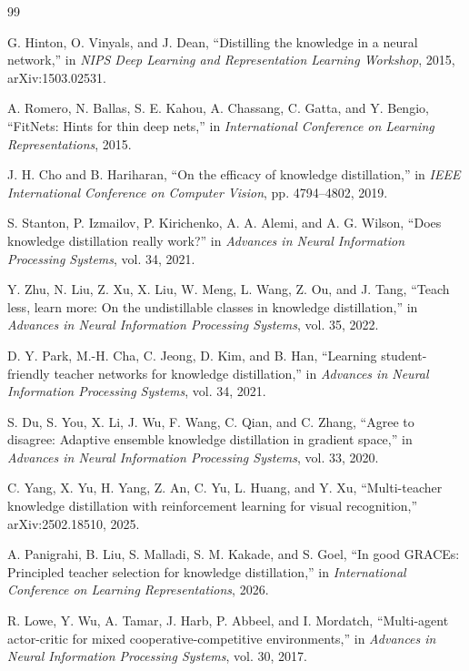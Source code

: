 \documentclass[10pt,twocolumn,a4paper]{article}
\begin{document}
\balance
\begin{thebibliography}{99}

G. Hinton, O. Vinyals, and J. Dean, ``Distilling the knowledge in a neural network,'' in \emph{NIPS Deep Learning and Representation Learning Workshop}, 2015, arXiv:1503.02531.

A. Romero, N. Ballas, S. E. Kahou, A. Chassang, C. Gatta, and Y. Bengio, ``FitNets: Hints for thin deep nets,'' in \emph{International Conference on Learning Representations}, 2015.

J. H. Cho and B. Hariharan, ``On the efficacy of knowledge distillation,'' in \emph{IEEE International Conference on Computer Vision}, pp. 4794--4802, 2019.

S. Stanton, P. Izmailov, P. Kirichenko, A. A. Alemi, and A. G. Wilson, ``Does knowledge distillation really work?'' in \emph{Advances in Neural Information Processing Systems}, vol. 34, 2021.

Y. Zhu, N. Liu, Z. Xu, X. Liu, W. Meng, L. Wang, Z. Ou, and J. Tang, ``Teach less, learn more: On the undistillable classes in knowledge distillation,'' in \emph{Advances in Neural Information Processing Systems}, vol. 35, 2022.

D. Y. Park, M.-H. Cha, C. Jeong, D. Kim, and B. Han, ``Learning student-friendly teacher networks for knowledge distillation,'' in \emph{Advances in Neural Information Processing Systems}, vol. 34, 2021.

S. Du, S. You, X. Li, J. Wu, F. Wang, C. Qian, and C. Zhang, ``Agree to disagree: Adaptive ensemble knowledge distillation in gradient space,'' in \emph{Advances in Neural Information Processing Systems}, vol. 33, 2020.

C. Yang, X. Yu, H. Yang, Z. An, C. Yu, L. Huang, and Y. Xu, ``Multi-teacher knowledge distillation with reinforcement learning for visual recognition,'' arXiv:2502.18510, 2025.

A. Panigrahi, B. Liu, S. Malladi, S. M. Kakade, and S. Goel, ``In good GRACEs: Principled teacher selection for knowledge distillation,'' in \emph{International Conference on Learning Representations}, 2026.

R. Lowe, Y. Wu, A. Tamar, J. Harb, P. Abbeel, and I. Mordatch, ``Multi-agent actor-critic for mixed cooperative-competitive environments,'' in \emph{Advances in Neural Information Processing Systems}, vol. 30, 2017.


\end{thebibliography}
\end{document}
